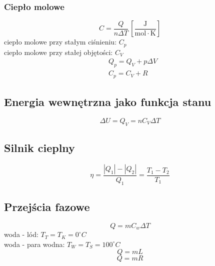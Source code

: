 \documentclass{article}
\numberwithin{equation}{section}
\newcommand{\unit}[1]{\, \left[\mathrm{#1}\right]}
\begin{document}
      \subsubsection{Ciepło molowe}
        \begin{equation}
          C = \frac{Q}{n\Delta T} \unit{\frac{J}{mol\cdot K}}
        \end{equation}
        ciepło molowe przy stałym ciśnieniu: $C_p$\\
        ciepło molowe przy stałej objętości: $C_V$
        \begin{align}
          &Q_p = Q_V + p\Delta V\\
          &C_p = C_V + R
        \end{align}
    \subsection{Energia wewnętrzna jako funkcja stanu}
      \begin{equation}
        \Delta U = Q_V = nC_V\Delta T
      \end{equation}
      \subsection{Silnik cieplny}
        \begin{center}
        \end{center}
      \begin{equation}
        \eta = \frac{|Q_1|-|Q_2|}{Q_1} = \frac{T_1 - T_2}{T_1}
      \end{equation}
    \subsection{Przejścia fazowe}
      \begin{equation}
        Q = mC_w\Delta T
      \end{equation}
      woda - lód: $T_T = T_K = 0^\circ C$\\
      woda - para wodna: $T_W = T_S = 100^\circ C$
      \begin{equation}
        Q = mL
      \end{equation}
      \begin{equation}
        Q = mR
      \end{equation}
\end{document}
